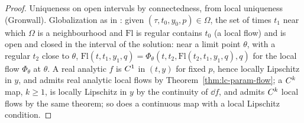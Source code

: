\begin{proof}
  \leanok
  Uniqueness on open intervals by connectedness, from local uniqueness (Gronwall). Globalization as
  in \cite[Theorem~2.5.18]{GN26}: given $(\tau, t_0, y_0, p) \in \Omega$, the set of times $t_1$
  near which $\Omega$ is a neighbourhood and $\mathrm{Fl}$ is regular contains $t_0$ (a local flow)
  and is open and closed in the interval of the solution: near a limit point $\theta$, with a
  regular $t_2$ close to $\theta$, $\mathrm{Fl}(t, t_1, y_1, q) =
  \Phi_\theta(t, t_2, \mathrm{Fl}(t_2, t_1, y_1, q), q)$ for the local flow $\Phi_\theta$ at
  $\theta$. A real analytic $f$ is $C^{1}$ in $(t, y)$ for fixed $p$, hence locally Lipschitz in
  $y$, and admits real analytic local flows by Theorem~\ref{thm:lc-param-flow}; a $C^{k}$ map,
  $k \ge 1$, is locally Lipschitz in $y$ by the continuity of $\dd f$, and admits $C^{k}$ local
  flows by the same theorem; so does a continuous map with a local Lipschitz condition.
\end{proof}
